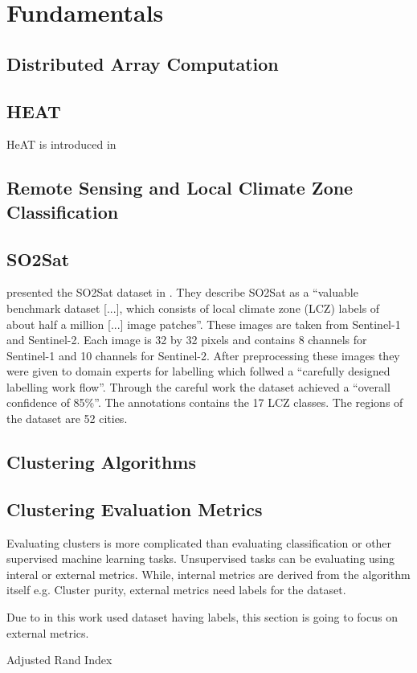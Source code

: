 \section{Fundamentals}
\label{sec:fundamentals}

\subsection{Distributed Array Computation}
\label{ssec:distributed_array_computation}

\subsection{HEAT}
\label{ssec:heat}
\gls{HeAT} is introduced in \cite{krajsek_helmholtz_nodate}

\subsection{Remote Sensing and Local Climate Zone Classification}
\label{ssec:remote_sensing_and_local_climate_zone_classification}

\subsection{SO2Sat}
\citeauthor{zhu_so2sat_2019} presented the SO2Sat dataset in \cite{zhu_so2sat_2019}. They describe SO2Sat as a \enquote{valuable benchmark dataset [...], which consists of local climate zone (LCZ) labels of about half a million [...] image patches}.
These images are taken from Sentinel-1 and Sentinel-2. Each image is 32 by 32 pixels and contains 8 channels for Sentinel-1 and 10 channels for Sentinel-2.
After preprocessing these images they were given to domain experts for labelling which follwed a \enquote{carefully designed labelling work flow}.
Through the careful work the dataset achieved a \enquote{overall confidence of 85\%}.
The annotations contains the 17 LCZ classes.
The regions of the dataset are 52 cities.

\subsection{Clustering Algorithms}
\label{ssec:clustering_algorithms}


\subsection{Clustering Evaluation Metrics}
\label{ssec:clustering_evaluation_metrics}

Evaluating clusters is more complicated than evaluating classification or other supervised machine learning tasks.
Unsupervised tasks can be evaluating using interal or external metrics. While, internal metrics are derived from the algorithm itself e.g. Cluster purity, external metrics need labels for the dataset.

Due to in this work used dataset having labels, this section is going to focus on external metrics.

Adjusted Rand Index
